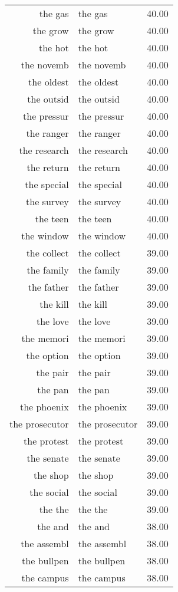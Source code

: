 \begin{table}[ht]
\begin{tabular}{rlr}
  the gas & the gas & 40.00 \\ 
  the grow & the grow & 40.00 \\ 
  the hot & the hot & 40.00 \\ 
  the novemb & the novemb & 40.00 \\ 
  the oldest & the oldest & 40.00 \\ 
  the outsid & the outsid & 40.00 \\ 
  the pressur & the pressur & 40.00 \\ 
  the ranger & the ranger & 40.00 \\ 
  the research & the research & 40.00 \\ 
  the return & the return & 40.00 \\ 
  the special & the special & 40.00 \\ 
  the survey & the survey & 40.00 \\ 
  the teen & the teen & 40.00 \\ 
  the window & the window & 40.00 \\ 
  the collect & the collect & 39.00 \\ 
  the family & the family & 39.00 \\ 
  the father & the father & 39.00 \\ 
  the kill & the kill & 39.00 \\ 
  the love & the love & 39.00 \\ 
  the memori & the memori & 39.00 \\ 
  the option & the option & 39.00 \\ 
  the pair & the pair & 39.00 \\ 
  the pan & the pan & 39.00 \\ 
  the phoenix & the phoenix & 39.00 \\ 
  the prosecutor & the prosecutor & 39.00 \\ 
  the protest & the protest & 39.00 \\ 
  the senate & the senate & 39.00 \\ 
  the shop & the shop & 39.00 \\ 
  the social & the social & 39.00 \\ 
  the the & the the & 39.00 \\ 
  the and & the and & 38.00 \\ 
  the assembl & the assembl & 38.00 \\ 
  the bullpen & the bullpen & 38.00 \\ 
  the campus & the campus & 38.00 \\ 

\end{tabular}
\end{table}
